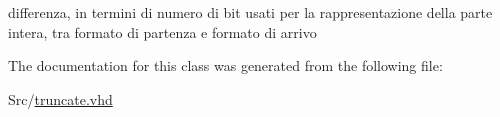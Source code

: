 differenza, in termini di numero di bit usati per la rappresentazione della parte intera, tra formato di partenza e formato di arrivo 



The documentation for this class was generated from the following file\+:\begin{DoxyCompactItemize}
\item 
Src/\hyperlink{truncate_8vhd}{truncate.\+vhd}\end{DoxyCompactItemize}
